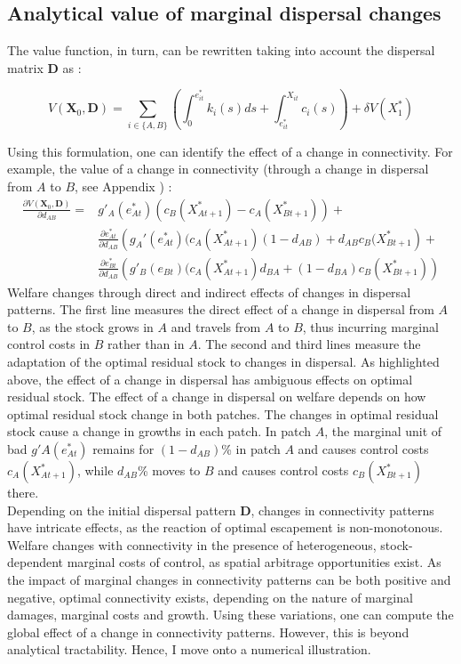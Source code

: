 \subsection{Analytical value of marginal dispersal changes}

The value function, in turn, can be rewritten taking into account the dispersal matrix $\mathbf{D}$ as : 

\begin{equation*}
V(\mathbf{X}_0, \mathbf{D}) = \sum_{i \in \{A,B\}}\left( \int_{0}^{e^*_{it}} k_i(s) ds + \int_{e^*_{it}}^{X_{it}} c_i(s)\right) + \delta V(X^*_{1})
\end{equation*}

Using this formulation, one can identify the effect of a change in connectivity. For example, the value of a change in connectivity (through a change in dispersal from $A$ to $B$, see Appendix ) : 
\begin{align}
\frac{\partial V(\mathbf{X}_0, \mathbf{D})}{\partial d_{AB}} = & g'_A(e_{At}^*)(c_B(X_{At+1}^*) - c_A(X_{Bt+1}^*)) + \nonumber \\
& \frac{\partial e_{At}^*}{\partial d_{AB}} \left(g_A'(e_{At}^*) (c_A(X_{At+1}^*)(1- d_{AB}) + d_{AB} c_B(X_{Bt+1}^*\right)+ \nonumber \\
& \frac{\partial e_{Bt}^*}{\partial d_{AB}}\left(g'_B(e_{Bt}) (c_A(X_{At+1}^*) d_{BA} + (1- d_{BA})c_B(X_{Bt+1}^*)\right) \label{eq:variation_of_value_function}
\end{align}
Welfare changes through direct and indirect effects of changes in dispersal patterns. The first line measures the direct effect of a change in dispersal from $A$ to $B$, as the stock grows in $A$ and travels from $A$ to $B$, thus incurring marginal control costs in $B$ rather than in $A$. The second and third lines measure the adaptation of the optimal residual stock to changes in dispersal. As highlighted above, the effect of a change in dispersal has ambiguous effects on optimal residual stock. The effect of a change in dispersal on welfare depends on how optimal residual stock change in both patches. The changes in optimal residual stock cause a change in growths in each patch. In patch $A$, the marginal unit of bad $g'A(e_{At}^*)$ remains for $(1-d_{AB})$\% in patch $A$ and causes control costs $c_A(X_{At+1}^*)$, while $d_{AB}$\% moves to $B$ and causes control costs $c_B(X_{Bt+1}^*)$ there. \\
Depending on the initial dispersal pattern $\mathbf{D}$, changes in connectivity patterns have intricate effects, as the reaction of optimal escapement is non-monotonous. Welfare changes with connectivity in the presence of heterogeneous, stock-dependent marginal costs of control, as spatial arbitrage opportunities exist. As the impact of marginal changes in connectivity patterns can be both positive and negative, optimal connectivity exists, depending on the nature of marginal damages, marginal costs and growth. 
Using these variations, one can compute the global effect of a change in connectivity patterns. However, this is beyond analytical tractability. Hence, I move onto a numerical illustration. 

